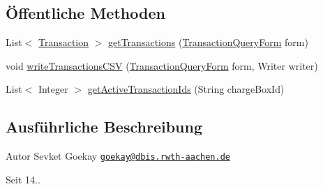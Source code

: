 \subsection*{Öffentliche Methoden}
\begin{DoxyCompactItemize}
\item 
List$<$ \hyperlink{classde_1_1rwth_1_1idsg_1_1steve_1_1repository_1_1dto_1_1_transaction}{Transaction} $>$ \hyperlink{classde_1_1rwth_1_1idsg_1_1steve_1_1repository_1_1impl_1_1_transaction_repository_impl_a689201f77f62c58cea7558286010b3e3}{get\-Transactions} (\hyperlink{classde_1_1rwth_1_1idsg_1_1steve_1_1web_1_1dto_1_1_transaction_query_form}{Transaction\-Query\-Form} form)
\item 
void \hyperlink{classde_1_1rwth_1_1idsg_1_1steve_1_1repository_1_1impl_1_1_transaction_repository_impl_a77bd16d6db0ae7bb1ab7a29dbe604628}{write\-Transactions\-C\-S\-V} (\hyperlink{classde_1_1rwth_1_1idsg_1_1steve_1_1web_1_1dto_1_1_transaction_query_form}{Transaction\-Query\-Form} form, Writer writer)
\item 
List$<$ Integer $>$ \hyperlink{classde_1_1rwth_1_1idsg_1_1steve_1_1repository_1_1impl_1_1_transaction_repository_impl_a8dfc3dfb7967756c32a3c61ab124ae50}{get\-Active\-Transaction\-Ids} (String charge\-Box\-Id)
\end{DoxyCompactItemize}


\subsection{Ausführliche Beschreibung}
\begin{DoxyAuthor}{Autor}
Sevket Goekay \href{mailto:goekay@dbis.rwth-aachen.de}{\tt goekay@dbis.\-rwth-\/aachen.\-de} 
\end{DoxyAuthor}
\begin{DoxySince}{Seit}
14.. 
\end{DoxySince}


